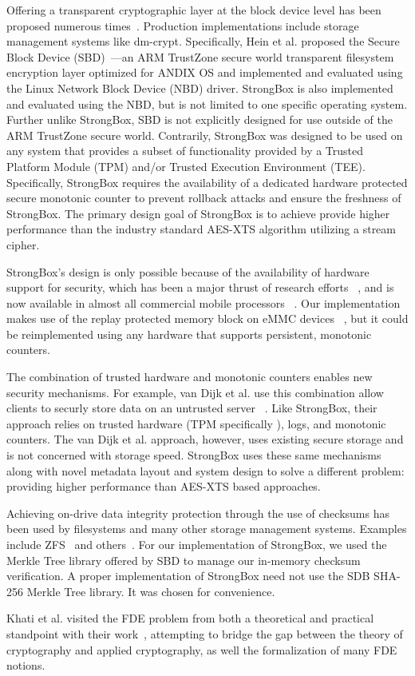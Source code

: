 Offering a transparent cryptographic layer at the block device level has been
proposed numerous times~\cite{SBD}. Production implementations include storage
management systems like dm-crypt. Specifically, Hein et al. proposed the Secure
Block Device (SBD)~\cite{SBD}---an ARM TrustZone secure world transparent
filesystem encryption layer optimized for ANDIX OS and implemented and evaluated
using the Linux Network Block Device (NBD) driver. StrongBox is also implemented
and evaluated using the NBD, but is not limited to one specific operating
system. Further unlike StrongBox, SBD is not explicitly designed for use outside
of the ARM TrustZone secure world. Contrarily, StrongBox was designed to be used
on any system that provides a subset of functionality provided by a Trusted
Platform Module (TPM) and/or Trusted Execution Environment (TEE). Specifically,
StrongBox requires the availability of a dedicated hardware protected secure
monotonic counter to prevent rollback attacks and ensure the freshness of
StrongBox. The primary design goal of StrongBox is to achieve provide higher
performance than the industry standard AES-XTS algorithm utilizing a stream
cipher.

StrongBox's design is only possible because of the availability of
hardware support for security, which has been a major thrust of
research efforts
~\cite{asplos1,asplos2,asplos3,asplos4,isca1,isca2},
and is now available in almost all commercial mobile processors
~\cite{TPM,TEE,RPMB,Kirovski}. Our implementation makes use of the
replay protected memory block on eMMC devices
~\cite{eMMC-standard,RPMB}, but it could be reimplemented using any
hardware that supports persistent, monotonic counters.

The combination of trusted hardware and monotonic counters enables new
security mechanisms. For example, van Dijk et al. use this
combination allow clients to securly store data on an untrusted server
~\cite{CSAIL-TPM}. Like StrongBox, their approach relies on trusted
hardware (TPM specifically \cite{TPM}), logs, and monotonic counters.
The van Dijk et al. approach, however, uses existing secure storage
and is not concerned with storage speed. StrongBox uses these same
mechanisms along with novel metadata layout and system design to solve
a different problem: providing higher performance than AES-XTS based
approaches.

Achieving on-drive data integrity protection through the use of checksums has
been used by filesystems and many other storage management systems. Examples
include ZFS~\cite{ZFS} and others~\cite{SBD}. For our implementation of
StrongBox, we used the Merkle Tree library offered by SBD to manage our
in-memory checksum verification. A proper implementation of StrongBox need not
use the SDB SHA-256 Merkle Tree library. It was chosen for convenience.

Khati et al. visited the FDE problem from both a theoretical and practical
standpoint with their work~\cite{FDETheoryPrac}, attempting to bridge the gap between the
theory of cryptography and applied cryptography, as well the formalization of
many FDE notions.

